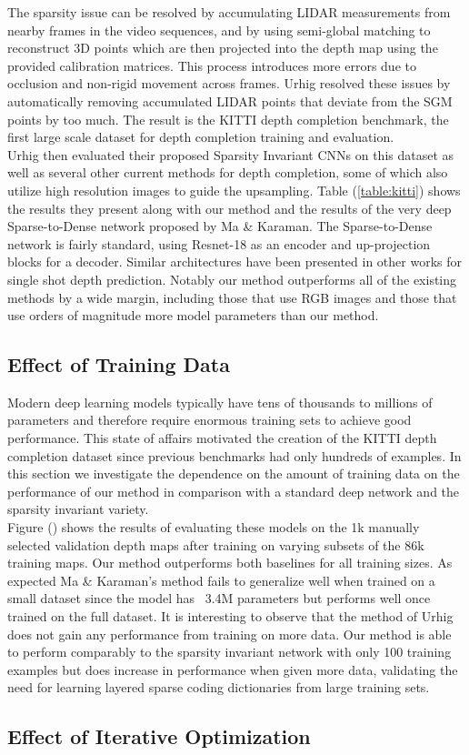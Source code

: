The sparsity issue can be resolved by accumulating LIDAR measurements from nearby frames in the video sequences, and by using semi-global matching to reconstruct 3D points which are then projected into the depth map using the provided calibration matrices. This process introduces more errors due to occlusion and non-rigid movement across frames. Urhig \etal resolved these issues by automatically removing accumulated LIDAR points that deviate from the SGM points by too much. The result is the KITTI depth completion benchmark, the first large scale dataset for depth completion training and evaluation.\\

Urhig \etal then evaluated their proposed Sparsity Invariant CNNs on this dataset as well as several other current methods for depth completion, some of which also utilize high resolution images to guide the upsampling. Table (\ref{table:kitti}) shows the results they present along with our method and the results of the very deep Sparse-to-Dense network proposed by Ma \& Karaman. The Sparse-to-Dense network is fairly standard, using Resnet-18 as an encoder and up-projection blocks for a decoder. Similar architectures have been presented in other works for single shot depth prediction. Notably our method outperforms all of the existing methods by a wide margin, including those that use RGB images and those that use orders of magnitude more model parameters than our method.
\subsection{Effect of Training Data}
\label{sec:effect-training-data}
Modern deep learning models typically have tens of thousands to millions of parameters and therefore require enormous training sets to achieve good performance. This state of affairs motivated the creation of the KITTI depth completion dataset since previous benchmarks had only hundreds of examples. In this section we investigate the dependence on the amount of training data on the performance of our method in comparison with a standard deep network and the sparsity invariant variety.\\
Figure () shows the results of evaluating these models on the 1k manually selected validation depth maps after training on varying subsets of the 86k training maps. Our method outperforms both baselines for all training sizes. As expected Ma \& Karaman's method fails to generalize well when trained on a small dataset since the model has ~3.4M parameters but performs well once trained on the full dataset. It is interesting to observe that the method of Urhig \etal does not gain any performance from training on more data. Our method is able to perform comparably to the sparsity invariant network with only 100 training examples but does increase in performance when given more data, validating the need for learning layered sparse coding dictionaries from large training sets.
\subsection{Effect of Iterative Optimization}
\label{sec:effect-iter-optim}

